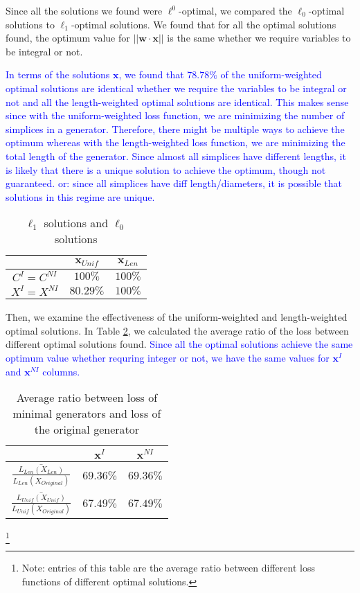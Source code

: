 \documentclass[11pt]{article}
\newcommand{\x}[0]{\mathbf{x}}
\begin{document}
Since all the solutions we found were $\ell^0$-optimal, we compared the $\ell_0$-optimal solutions to $\ell_1$-optimal solutions. We found that for all the optimal solutions found, the optimum value for $||\mathbf{w} \cdot \x||$ is the same whether we require variables to be integral or not. 

\textcolor{blue}{In terms of the solutions $\x$, we found that $78.78\%$ of the uniform-weighted optimal solutions are identical whether we require the variables to be integral or not and all the length-weighted optimal solutions are identical. This makes sense since with the uniform-weighted loss function, we are minimizing the number of simplices in a generator. Therefore, there might be multiple ways to achieve the optimum whereas with the length-weighted loss function, we are minimizing the total length of the generator. Since almost all simplices have different lengths, it is likely that there is a unique solution to achieve the optimum, though not guaranteed. or: since all simplices have diff length/diameters, it is possible that solutions in this regime are unique. }

\begin{table}[h]
    \centering
    \begin{tabular}{|c|c|c|}
    \hline
         & $\x_{Unif}$ & $\x_{Len}$\\ \hline
         $C^{I} = C^{NI}$ & $100\%$  & $100\%$ \\ \hline
         $X^I = X^{NI}$ & $80.29\%$ & $100\%$ \\ \hline
    \end{tabular}
    \caption{$\ell_1$ solutions and $\ell_0$ solutions}
    \label{tab:my_label}
\end{table}
Then, we examine the effectiveness of the uniform-weighted and length-weighted optimal solutions. In Table \ref{tab:effectiveness}, we calculated the average ratio of the loss between different optimal solutions found. \textcolor{blue}{ Since all the optimal solutions achieve the same optimum value whether requring integer or not, we have the same values for $\x^{I}$ and $\x^{NI}$ columns. }

\begin{table}[H]
    \centering
    \begin{tabular}{|c|c|c|}
    \hline
         & $\x^{I}$ & $\x^{NI}$\\ \hline
         $  \overline{\frac{L_{Len}(X_{Len})}{L_{Len}(X_{Original})}}$ & $69.36\%$  & $69.36\%$ \\ \hline
         $\overline{\frac{L_{Unif}(X_{Unif})}{L_{Unif}(X_{Original})}}$ & $67.49\%$ & $67.49\%$ \\ \hline
    \end{tabular}
    \caption{ Average ratio between loss of minimal generators and loss of the original generator }
    \label{tab:effectiveness}
\end{table}
\footnote{Note: entries of this table are the average ratio between different loss functions of different optimal solutions.}
\end{document}
